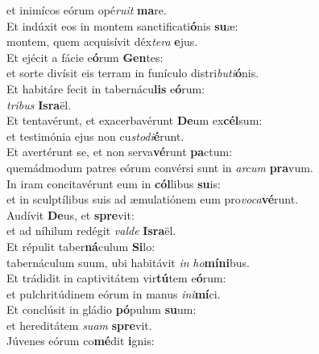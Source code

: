 \evenverse et inimícos eórum opé\textit{ru}\textit{it} \textbf{ma}re.\\
\oddverse Et indúxit eos in montem sanctificati\textbf{ó}nis \textbf{su}æ:~\*\\
\oddverse montem, quem acquisívit déx\textit{te}\textit{ra} \textbf{e}jus.\\
\evenverse Et ejécit a fácie e\textbf{ó}rum \textbf{Gen}tes:~\*\\
\evenverse et sorte divísit eis terram in funículo distri\textit{bu}\textit{ti}\textbf{ó}nis.\\
\oddverse Et habitáre fecit in tabernácu\textbf{lis} e\textbf{ó}rum:~\*\\
\oddverse \textit{tri}\textit{bus} \textbf{Is}\textbf{ra}ël.\\
\evenverse Et tentavérunt, et exacerbavérunt \textbf{De}um ex\textbf{cél}sum:~\*\\
\evenverse et testimónia ejus non cu\textit{sto}\textit{di}\textbf{é}runt.\\
\oddverse Et avertérunt se, et non serva\textbf{vé}runt \textbf{pa}ctum:~\*\\
\oddverse quemádmodum patres eórum convérsi sunt in \textit{ar}\textit{cum} \textbf{pra}vum.\\
\evenverse In iram concitavérunt eum in \textbf{cól}libus \textbf{su}is:~\*\\
\evenverse et in sculptílibus suis ad æmulatiónem eum pro\textit{vo}\textit{ca}\textbf{vé}runt.\\
\oddverse Audívit \textbf{De}us, et \textbf{spre}vit:~\*\\
\oddverse et ad níhilum redégit \textit{val}\textit{de} \textbf{Is}\textbf{ra}ël.\\
\evenverse Et répulit taber\textbf{ná}culum \textbf{Si}lo:~\*\\
\evenverse tabernáculum suum, ubi habitávit \textit{in} \textit{ho}\textbf{mí}\textbf{ni}bus.\\
\oddverse Et trádidit in captivitátem vir\textbf{tú}tem e\textbf{ó}rum:~\*\\
\oddverse et pulchritúdinem eórum in manus \textit{i}\textit{ni}\textbf{mí}ci.\\
\evenverse Et conclúsit in gládio \textbf{pó}pulum \textbf{su}um:~\*\\
\evenverse et hereditátem \textit{su}\textit{am} \textbf{spre}vit.\\
\oddverse Júvenes eórum co\textbf{mé}dit \textbf{i}gnis:~\*\\
